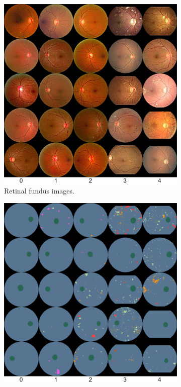 \begin{figure}[h]
    \centering
    \begin{subfigure}{0.45\textwidth}
        \centering
        \includegraphics[width=\linewidth]{datasets/figs/fgadr_real_sample.pdf}
        \caption{Retinal fundus images.}
        \label{fig:fgadr_sample_real}
    \end{subfigure} %
    \begin{subfigure}{0.45\textwidth}
        \centering
        \includegraphics[width=\linewidth]{datasets/figs/fgadr_label_sample.pdf}

\end{subfigure}
\end{figure}
